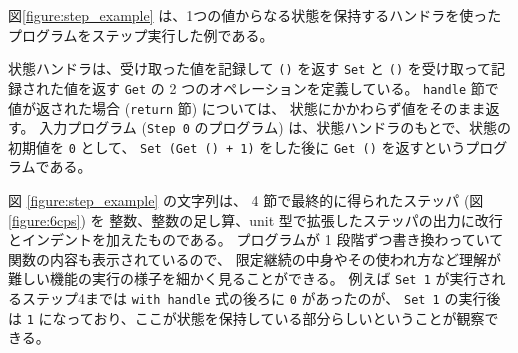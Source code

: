 図\ref{figure:step_example} は、1つの値からなる状態を保持するハンドラを使ったプログラムをステップ実行した例である。

状態ハンドラは、受け取った値を記録して \texttt{()} を返す \texttt{Set} と
\texttt{()} を受け取って記録された値を返す \texttt{Get} の 2 つのオペレーションを定義している。
\texttt{handle} 節で値が返された場合 (\texttt{return} 節) については、
状態にかかわらず値をそのまま返す。
入力プログラム (\texttt{Step 0} のプログラム) は、状態ハンドラのもとで、状態の初期値を \texttt{0} として、
\texttt{Set (Get () + 1)} をした後に \texttt{Get ()} を返すというプログラムである。

図 \ref{figure:step_example} の文字列は、
4 節で最終的に得られたステッパ (図\ref{figure:6cps}) を
整数、整数の足し算、unit 型で拡張したステッパの出力に改行とインデントを加えたものである。
プログラムが 1 段階ずつ書き換わっていて関数の内容も表示されているので、
限定継続の中身やその使われ方など理解が難しい機能の実行の様子を細かく見ることができる。
例えば \texttt{Set 1} が実行されるステップ4までは \texttt{with handle} 式の後ろに \texttt{0} があったのが、
\texttt{Set 1} の実行後は \texttt{1} になっており、ここが状態を保持している部分らしいということが観察できる。
